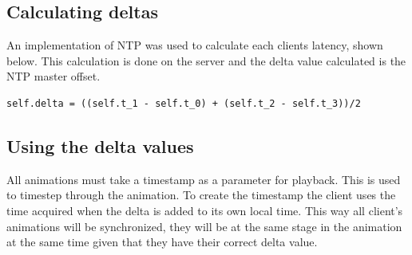 \subsection{Calculating deltas}
An implementation of NTP was used to calculate each clients latency, shown below. This calculation is done on the server and the delta value calculated is the NTP master offset. 

\begin{verbatim}
self.delta = ((self.t_1 - self.t_0) + (self.t_2 - self.t_3))/2
\end{verbatim}

\subsection {Using the delta values}

All animations must take a timestamp as a parameter for playback. This is used to timestep through the animation. To create the timestamp the client uses the time acquired when the delta is added to its own local time. This way all client's animations will be synchronized, they will be at the same stage in the animation at the same time given that they have their correct delta value. 


